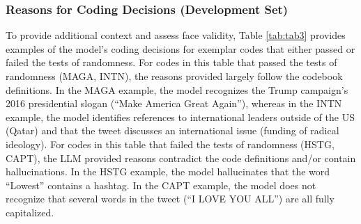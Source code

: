 \documentclass{article}
\begin{document}
\subsubsection{Reasons for Coding Decisions (Development Set)}
\label{code-reasons}

To provide additional context and assess face validity, Table \ref{tab:tab3} provides examples of the model’s coding decisions for exemplar codes that either passed or failed the tests of randomness.  For codes in this table that passed the tests of randomness (MAGA, INTN), the reasons provided largely follow the codebook definitions. In the MAGA example, the model recognizes the Trump campaign’s 2016 presidential slogan (“Make America Great Again”), whereas in the INTN example, the model identifies references to international leaders outside of the US (Qatar) and that the tweet discusses an international issue (funding of radical ideology).  For codes in this table that failed the tests of randomness (HSTG, CAPT), the LLM provided reasons contradict the code definitions and/or contain hallucinations.  In the HSTG example, the model hallucinates that the word “Lowest” contains a hashtag.  In the CAPT example, the model does not recognize that several words in the tweet (“I LOVE YOU ALL”) are all fully capitalized.
\end{document}
